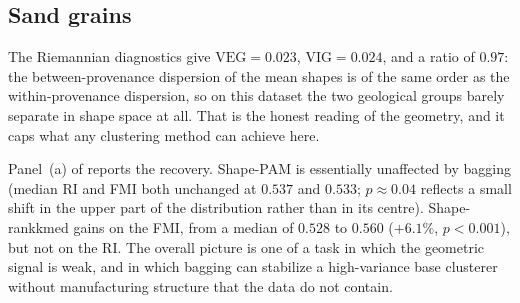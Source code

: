\documentclass[review,11pt,3p,authoryear]{elsarticle}
\newcommand{\rmVEG}{\mathrm{VEG}}
\newcommand{\rmVIG}{\mathrm{VIG}}
\begin{document}
\subsection{Sand grains}
\label{subsec:realdata:sand}

The Riemannian diagnostics give $\rmVEG=0.023$, $\rmVIG=0.024$, and a
ratio of $0.97$: the between-provenance dispersion of the mean shapes is
of the same order as the within-provenance dispersion, so on this dataset
the two geological groups barely separate in shape space at all. That is
the honest reading of the geometry, and it caps what any clustering
method can achieve here.

Panel~(a) of  reports the recovery. Shape-PAM is essentially unaffected
by bagging (median RI and FMI both unchanged at $0.537$ and $0.533$;
$p\approx0.04$ reflects a small shift in the upper part of the
distribution rather than in its centre). Shape-rankkmed gains on the FMI,
from a median of $0.528$ to $0.560$ ($+6.1\%$, $p<0.001$), but not on the
RI. The overall picture is one of a task in which the geometric signal is
weak, and in which bagging can stabilize a high-variance base clusterer
without manufacturing structure that the data do not contain.
\end{document}
